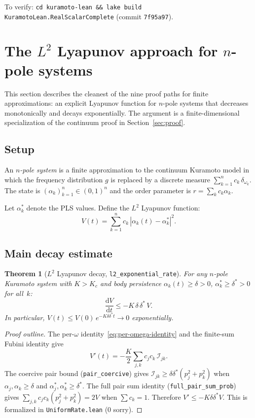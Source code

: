 \documentclass[11pt,a4paper]{article}
\newtheorem{theorem}{Theorem}[section]
\theoremstyle{definition}
\begin{document}
\medskip\noindent To verify: \texttt{cd kuramoto-lean \&\& lake build KuramotoLean.RealScalarComplete} (commit \texttt{7f95a97}).

\section{The $L^2$ Lyapunov approach for $n$-pole systems}\label{sec:npole}

This section describes the cleanest of the nine proof paths for finite approximations: an explicit Lyapunov function for $n$-pole systems that decreases monotonically and decays exponentially. The argument is a finite-dimensional specialization of the continuum proof in Section~\ref{sec:proof}.

\subsection{Setup}

An \emph{$n$-pole system} is a finite approximation to the continuum Kuramoto model in which the frequency distribution $g$ is replaced by a discrete measure $\sum_{k=1}^n c_k\,\delta_{\omega_k}$. The state is $(\alpha_k)_{k=1}^n \in (0,1)^n$ and the order parameter is $r = \sum_k c_k \alpha_k$.

Let $\alpha^*_k$ denote the PLS values. Define the $L^2$ Lyapunov function:
\begin{equation}\label{eq:lyap}
V(t) = \sum_{k=1}^n c_k\,|\alpha_k(t) - \alpha^*_k|^2.
\end{equation}

\subsection{Main decay estimate}

\begin{theorem}[$L^2$ Lyapunov decay, \texttt{l2\_exponential\_rate}]\label{thm:lyapunov}
For any $n$-pole Kuramoto system with $K > K_c$ and body persistence $\alpha_k(t) \geq \delta > 0$, $\alpha^*_k \geq \delta^* > 0$ for all~$k$:
\[
\frac{\mathrm{d}V}{\mathrm{d}t} \leq -K\,\delta\,\delta^*\,V.
\]
In particular, $V(t) \leq V(0)\,e^{-K\delta\delta^* t} \to 0$ exponentially.
\end{theorem}

\begin{proof}[Proof outline]
The per-$\omega$ identity~\eqref{eq:per-omega-identity} and the finite-sum Fubini identity give
\[
V'(t) = -\frac{K}{2}\sum_{j,k} c_j c_k\,\mathcal{I}_{jk}.
\]
The coercive pair bound (\texttt{pair\_coercive}) gives $\mathcal{I}_{jk} \geq \delta\delta^*(p_j^2 + p_k^2)$ when $\alpha_j, \alpha_k \geq \delta$ and $\alpha^*_j, \alpha^*_k \geq \delta^*$. The full pair sum identity (\texttt{full\_pair\_sum\_prob}) gives $\sum_{j,k} c_j c_k(p_j^2+p_k^2) = 2V$ when $\sum c_k = 1$. Therefore $V' \leq -K\delta\delta^* V$. This is formalized in \texttt{UniformRate.lean} (0 sorry).
\end{proof}
\end{document}
